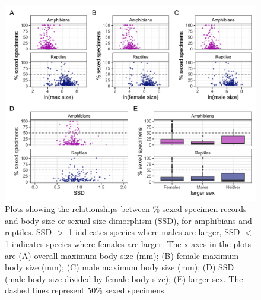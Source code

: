 \documentclass[a4paper, 12pt]{article}
\begin{document}
\newpage
\begin{figure}[h]
 \centering
  \includegraphics[width = \linewidth]{figures/size-combined-unsexed.png}
  \caption{Plots showing the relationships between \% sexed specimen records and body size or sexual size dimorphism (SSD), for amphibians and reptiles. SSD $>$ 1 indicates species where males are larger, SSD $<$ 1 indicates species where females are larger. The x-axes in the plots are (A) overall maximum body size (mm); (B) female maximum body size (mm); (C) male maximum body size (mm); (D) SSD (male body size divided by female body size); (E) larger sex. The dashed lines represent 50\% sexed specimens. 
}
  \label{fig-ssd-sex}
\end{figure} 
\end{document}

